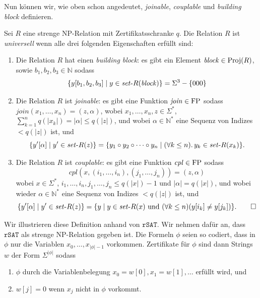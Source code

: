 Nun können wir, wie oben schon angedeutet, \emph{joinable}, \emph{couplable} und \emph{building block} definieren.
\begin{definition}\label{def:universal}
    Sei $R$ eine strenge NP-Relation mit Zertifikatsschranke $q$.
    Die Relation $R$ ist \emph{universell} wenn alle drei folgenden Eigenschaften erfüllt sind:
    \begin{enumerate}
        \item Die Relation $R$ hat einen \emph{building block}:  es gibt ein Element $\mathit{block}\in\operatorname{Proj}(R)$, sowie $b_1,b_2,b_3\in\mathbb N$ sodass
            \[\{ y[b_1,b_2,b_3] \mid y\in \mathit{set}\text{-}{}R(\mathit{block}) \} = \Sigma^3 - \{000\} \]
        \item Die Relation $R$ ist \emph{joinable}: es gibt eine Funktion $\mathit{join}\in \mathrm{FP}$ sodass
           $ \mathit{join}(x_1, \dots, x_n) = (z, \alpha)$, wobei $x_1, \ldots, x_n, z\in \Sigma^*$, $\sum_{k=1}^n q(|x_k|)=|\alpha|\leq q(|z|)$, und
            wobei $\alpha\in \mathbb N^*$ eine Sequenz von Indizes $<q(|z|)$ ist, und
            \begin{equation*} \{ y'[\alpha] \mid y' \in \mathit{set}\text{-}{}R(z)\} = \{ y_1\circ y_2 \circ \cdots \circ y_n \mid (\forall k\leq n).\, y_k \in \mathit{set}\text{-}{}R(x_k) \}. \end{equation*}
        \item Die Relation $R$ ist \emph{couplable}: es gibt eine Funktion $\mathit{cpl}\in \mathrm{FP}$ sodass
            \[  \mathit{cpl}(x, (i_1, \ldots, i_n), (j_1, \ldots, j_n)) = (z, \alpha) \]
        wobei $x\in\Sigma^*$, $i_1, \ldots, i_n, j_1,\ldots, j_n \leq q(|x|)-1$ und $|\alpha|=q(|x|)$, und
            wobei wieder $\alpha\in \mathbb N^*$ eine Sequenz von Indizes $<q(|z|)$ ist, und
            \begin{equation*} \{ y'[\alpha] \mid y'\in \mathit{set}\text{-}{}R(z) \} = \{ y \mid y\in \mathit{set}\text{-}{}R(x) \text{ und } (\forall k\leq n)(y[i_k]\neq y[j_k]) \}. \qedhere \end{equation*}
    \end{enumerate}
\end{definition}
Wir illustrieren diese Definition anhand von $\mathtt{rSAT}$. 
Wir nehmen dafür an, dass $\mathtt{rSAT}$ als strenge NP-Relation gegeben ist. Die Formeln $\phi$ seien so codiert, dass in $\phi$ nur die Variablen $x_0, \dots, x_{|\phi|-1}$ vorkommen.
Zertifikate für $\phi$ sind dann Strings $w$ der Form $\Sigma^{|\phi|}$ sodass 
\begin{enumerate}[nosep]
    \item $\phi$ durch die Variablenbelegung $x_0=w[0], x_1=w[1], \dots$ erfüllt wird, und
    \item $w[j]=0$ wenn $x_j$ nicht in $\phi$ vorkommt.
\end{enumerate}

